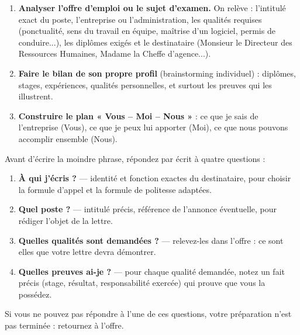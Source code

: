 \documentclass[11pt]{article}
\newcommand{\cle}[1]{{\popxbold\color{popdark}#1}}
\begin{document}
\begin{enumerate}
\item \textbf{Analyser l'offre d'emploi ou le sujet d'examen.} On relève : l'intitulé exact du \cle{poste}, l'entreprise ou l'administration, les \cle{qualités requises} (ponctualité, sens du travail en équipe, maîtrise d'un logiciel, permis de conduire...), les diplômes exigés et le \cle{destinataire} (Monsieur le Directeur des Ressources Humaines, Madame la Cheffe d'agence...).
\item \textbf{Faire le bilan de son propre profil} (brainstorming individuel) : diplômes, stages, expériences, qualités personnelles, et surtout les \cle{preuves} qui les illustrent.
\item \textbf{Construire le plan « Vous -- Moi -- Nous »} : ce que je sais de l'entreprise (Vous), ce que je peux lui apporter (Moi), ce que nous pouvons accomplir ensemble (Nous).
\end{enumerate}

\begin{methode}
Avant d'écrire la moindre phrase, répondez par écrit à quatre questions :
\begin{enumerate}
\item \textbf{À qui j'écris ?} — identité et fonction exactes du destinataire, pour choisir la formule d'appel et la formule de politesse adaptées.
\item \textbf{Quel poste ?} — intitulé précis, référence de l'annonce éventuelle, pour rédiger l'objet de la lettre.
\item \textbf{Quelles qualités sont demandées ?} — relevez-les dans l'offre : ce sont elles que votre lettre devra démontrer.
\item \textbf{Quelles preuves ai-je ?} — pour chaque qualité demandée, notez un fait précis (stage, résultat, responsabilité exercée) qui prouve que vous la possédez.
\end{enumerate}
Si vous ne pouvez pas répondre à l'une de ces questions, votre préparation n'est pas terminée : retournez à l'offre.
\end{methode}
\end{document}
